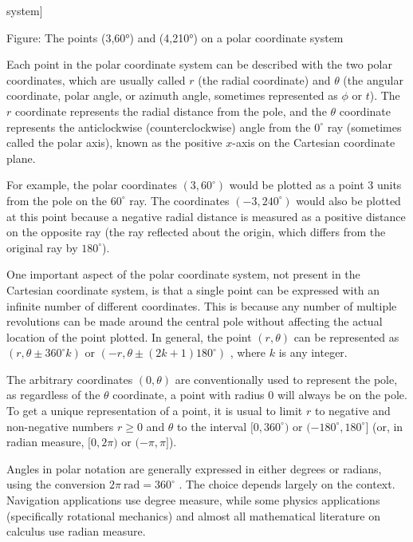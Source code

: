 
system]



Figure: The points (3,60°) and (4,210°) on a polar coordinate system



Each point in the polar coordinate system can be described with the two polar coordinates, which are usually called $r$ (the radial coordinate) and $\theta$ (the angular coordinate, polar angle, or azimuth angle, sometimes represented as $\phi$ or $t$). The $r$ coordinate represents the radial distance from the pole, and the $\theta$ coordinate represents the anticlockwise (counterclockwise) angle from the $0^\circ$ ray (sometimes called the polar axis), known as the positive $x$-axis on the Cartesian coordinate plane.



For example, the polar coordinates $(3,60^\circ)$ would be plotted as a point 3 units from the pole on the $60^\circ$ ray. The coordinates $(-3,240^\circ)$ would also be plotted at this point because a negative radial distance is measured as a positive distance on the opposite ray (the ray reflected about the origin, which differs from the original ray by $180^\circ$).



One important aspect of the polar coordinate system, not present in the Cartesian coordinate system, is that a single point can be expressed with an infinite number of different coordinates. This is because any number of multiple revolutions can be made around the central pole without affecting the actual location of the point plotted. In general, the point $(r,\theta)$ can be represented as $(r,\theta\pm360^\circ k)$ or $(-r,\theta\pm(2k+1)180^\circ)$ , where $k$ is any integer.



The arbitrary coordinates $(0,\theta)$ are conventionally used to represent the pole, as regardless of the $\theta$ coordinate, a point with radius 0 will always be on the pole. To get a unique representation of a point, it is usual to limit $r$ to negative and non-negative numbers $r\ge0$ and $\theta$ to the interval $[0,360^\circ)$ or $(-180^\circ,180^\circ]$ (or, in radian measure, $[0,2\pi)$ or $(-\pi,\pi]$).



Angles in polar notation are generally expressed in either degrees or radians, using the conversion $2\pi\ \text{rad}=360^\circ$ . The choice depends largely on the context. Navigation applications use degree measure, while some physics applications (specifically rotational mechanics) and almost all mathematical literature on calculus use radian measure.



